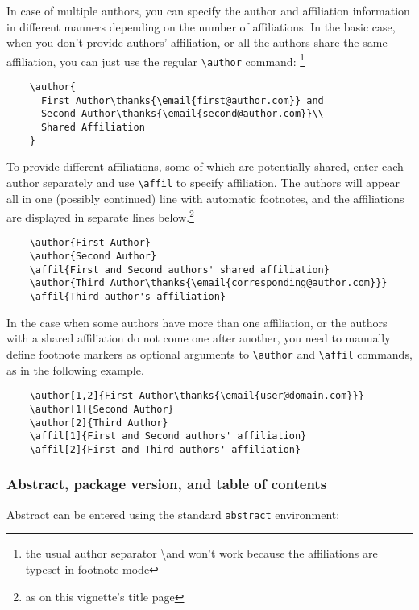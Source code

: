 \documentclass{article}
\begin{document}
In case of multiple authors, you can specify the author and affiliation information in different manners depending on 
the number of affiliations. In the basic case, when you don't provide authors'
affiliation, or all the authors share the same affiliation, you can just use the regular \verb+\author+ command:%
\footnote{the usual author separator {\ttfamily \textbackslash and} won't work because the affiliations are typeset in footnote mode}

\begin{verbatim}
    \author{
      First Author\thanks{\email{first@author.com}} and
      Second Author\thanks{\email{second@author.com}}\\
      Shared Affiliation
    }
\end{verbatim}

To provide different affiliations, some of which are potentially shared, 
enter each author separately and use \verb+\affil+
to specify affiliation. The authors will appear all in one (possibly continued) line
with automatic footnotes, and the affiliations are displayed in separate lines below.\footnote{as on this vignette's title page}

\begin{verbatim}
    \author{First Author}
    \author{Second Author}
    \affil{First and Second authors' shared affiliation}
    \author{Third Author\thanks{\email{corresponding@author.com}}}
    \affil{Third author's affiliation}
\end{verbatim}

In the case when some authors have more than one affiliation, or the authors with 
a shared affiliation do not come one after another, you need to manually define
footnote markers as optional arguments to \verb+\author+ and \verb+\affil+ commands, as in the following example.

\begin{verbatim}
    \author[1,2]{First Author\thanks{\email{user@domain.com}}}
    \author[1]{Second Author}
    \author[2]{Third Author}
    \affil[1]{First and Second authors' affiliation}
    \affil[2]{First and Third authors' affiliation}
\end{verbatim}


\subsubsection{Abstract, package version, and table of contents}

Abstract can be entered using the standard \verb+abstract+ environment:
\end{document}

